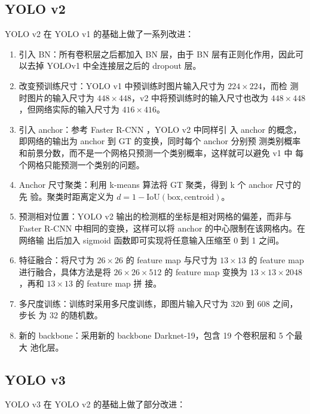 \subsection{YOLO v2}
\label{subsec:YOLOv2}
YOLO v2 在 YOLO v1 的基础上做了一系列改进：

\begin{enumerate}
  \item 引入 BN：所有卷积层之后都加入 BN 层，由于 BN 层有正则化作用，因此可以去掉
    YOLOv1 中全连接层之后的 dropout 层。
  \item 改变预训练尺寸：YOLO v1 中预训练时图片输入尺寸为 $224 \times 224$，而检
    测时图片的输入尺寸为 $448 \times 448$，v2 中将预训练时的输入尺寸也改为 $448
    \times 448$，但网络实际的输入尺寸为 $416 \times 416$。
  \item 引入 anchor：参考 Faster R-CNN \cite{2015-Faster-RCNN}，YOLO v2 中同样引
    入 anchor 的概念，即网络的输出为 anchor 到 GT 的变换，同时每个 anchor 分别预
    测类别概率和前景分数，而不是一个网格只预测一个类别概率，这样就可以避免 v1 中
    每个网格只能预测一个类别的问题。
  \item Anchor 尺寸聚类：利用 k-means 算法将 GT 聚类，得到 k 个 anchor 尺寸的先
    验。聚类时距离定义为 $d = 1 - \mathrm{IoU}(\mathrm{box}, \mathrm{centroid})$。
  \item 预测相对位置：YOLO v2 输出的检测框的坐标是相对网格的偏差，而非与
    Faster R-CNN 中相同的变换，这样可以将 anchor 的中心限制在该网格内。在网络输
    出后加入 sigmoid 函数即可实现将任意输入压缩至 0 到 1 之间。
  \item 特征融合：将尺寸为 $26 \times 26$ 的 feature map 与尺寸为 $13 \times 13$
    的 feature map 进行融合，具体方法是将 $26 \times 26 \times 512$ 的 feature
    map 变换为 $13 \times 13 \times 2048$，再和 $13 \times 13$ 的 feature map 拼
    接。
  \item 多尺度训练：训练时采用多尺度训练，即图片输入尺寸为 320 到 608 之间，步长
    为 32 的随机数。
  \item 新的 backbone：采用新的 backbone Darknet-19，包含 19 个卷积层和 5 个最大
    池化层。
\end{enumerate}

\subsection{YOLO v3}
\label{subsec:YOLOv3}
YOLO v3 在 YOLO v2 的基础上做了部分改进：

